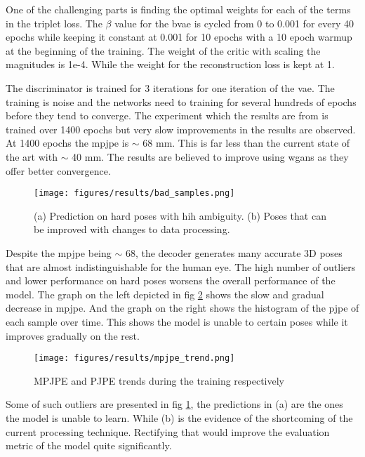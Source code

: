 One of the challenging parts is finding the optimal weights for each of the terms in the triplet loss. The $\beta$ value for the \ac{bvae} is cycled from 0 to 0.001 for every 40 epochs while keeping it constant at 0.001 for 10 epochs with a 10 epoch warmup at the beginning of the training. The weight of the critic with scaling the magnitudes is 1e-4. While the weight for the reconstruction loss is kept at 1. 

The discriminator is trained for 3 iterations for one iteration of the \ac{vae}. The training is noise and the networks need to training for several hundreds of epochs before they tend to converge. The experiment which the results are from is trained over 1400 epochs but very slow improvements in the results are observed. At 1400 epochs the \ac{mpjpe} is $\sim$ 68 mm. This is far less than the current state of the art \cite{amazon1} with $\sim$ 40 mm. The results are believed to improve using \acp{wgan} as they offer better convergence. 

\begin{figure}[h]
    \centering
    \texttt{[image: figures/results/bad\_samples.png]}
    \caption{(a) Prediction on hard poses with hih ambiguity. (b) Poses that can be improved with changes to data processing.}
    \label{fig:bad_samples}
\end{figure}

Despite the \ac{mpjpe} being $\sim$ 68, the decoder generates many accurate 3D poses that are almost indistinguishable for the human eye. The high number of outliers and lower performance on hard poses worsens the overall performance of the model. The graph on the left depicted in fig \ref{fig:mpjpe_trends} shows the slow and gradual decrease in \ac{mpjpe}. And the graph on the right shows the histogram of the \ac{pjpe} of each sample over time. This shows the model is unable to certain poses while it improves gradually on the rest. 

\begin{figure}[h]
    \centering
    \texttt{[image: figures/results/mpjpe\_trend.png]}
    \caption{MPJPE and PJPE trends during the training respectively}
    \label{fig:mpjpe_trends}
\end{figure}

Some of such outliers are presented in fig \ref{fig:bad_samples}, the predictions in (a) are the ones the model is unable to learn. While (b) is the evidence of the shortcoming of the current processing technique. Rectifying that would improve the evaluation metric of the model quite significantly.



